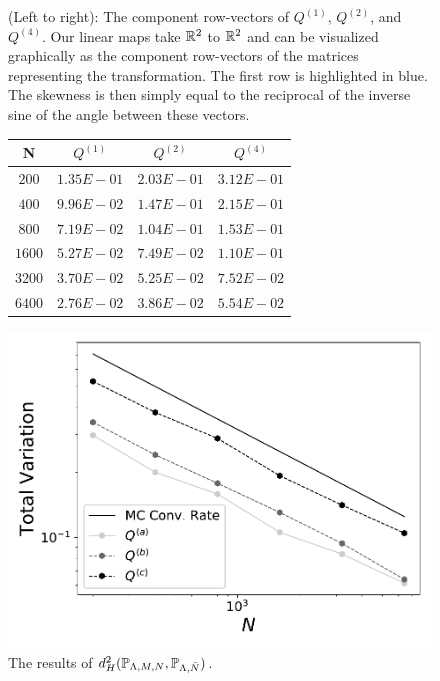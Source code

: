 \begin{figure}[h]
\begin{minipage}{.3\textwidth}
	\end{minipage}
\caption{(Left to right):  The component row-vectors of $Q^{(1)}$, $Q^{(2)}$, and $Q^{(4)}$. Our linear maps take $\mathbb{R}^2$ to $\mathbb{R}^2$ and can be visualized graphically as the component row-vectors of the matrices representing the transformation. The first row is highlighted in blue. The skewness is then simply equal to the reciprocal of the inverse sine of the angle between these vectors. }
\label{fig: skewmapvecs}
\end{figure}


\begin{figure}
\begin{minipage}{.5\textwidth}
\begin{table}[H]
\begin{tabular}{ c | c | c | c }
N & $Q^{(1)}$ & $Q^{(2)}$ & $Q^{(4)}$\\ \hline \hline
$200$ & $1.35E-01$ & $2.03E-01$ & $3.12E-01$\\ \hline

$400$ & $9.96E-02$ & $1.47E-01$ & $2.15E-01$\\ \hline

$800$ & $7.19E-02$ & $1.04E-01$ & $1.53E-01$\\ \hline

$1600$ & $5.27E-02$ & $7.49E-02$ & $1.10E-01$\\ \hline

$3200$ & $3.70E-02$ & $5.25E-02$ & $7.52E-02$\\ \hline

$6400$ & $2.76E-02$ & $3.86E-02$ & $5.54E-02$\\ \hline
\end{tabular}
\end{table}
\end{minipage}
\begin{minipage}{.45\textwidth}
		\includegraphics[width=\linewidth]{./images/Plot-reg_BigN_40000_reg_M_1_rand_I_100000}
\end{minipage}
\caption{The results of $d^2_H(\mathbb{P}_{{\Lambda}, M, N}, \mathbb{P}_{{\Lambda},\bar{N}})$.}
\label{fig:M1_2d}
\end{figure}


